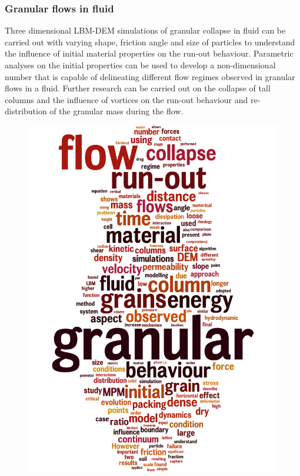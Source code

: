 \subsubsection*{Granular flows in fluid}

Three dimensional LBM-DEM simulations of granular collapse in fluid can be 
carried out with varying shape, friction angle and size of particles to 
understand the influence of initial material properties on the run-out 
behaviour. Parametric analyses on the initial properties can be used to develop 
a non-dimensional number that is capable of delineating different flow regimes 
observed in granular flows in a fluid. Further research can be carried out on 
the collapse of tall columns and the influence of vortices on the run-out 
behaviour and re-distribution of the granular mass during the flow.

\newpage
\thispagestyle{empty}
\begin{figure}[tbhp]
\centering
	\includegraphics[height=0.95\textheight]{word_cloud}
\end{figure}